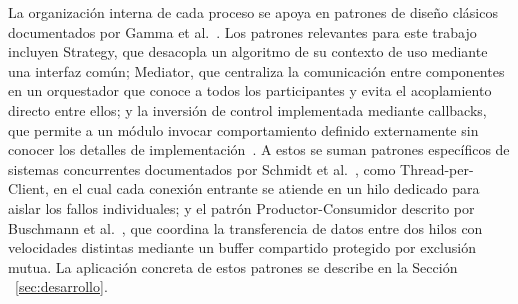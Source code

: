 La organización interna de cada proceso se apoya en patrones de 
diseño clásicos documentados por Gamma et al.~\cite{gof1994}. Los 
patrones relevantes para este trabajo incluyen Strategy, que 
desacopla un algoritmo de su contexto de uso mediante una interfaz 
común; Mediator, que centraliza la comunicación entre componentes 
en un orquestador que conoce a todos los participantes y evita el 
acoplamiento directo entre ellos; y la inversión de control 
implementada mediante callbacks, que permite a un módulo invocar 
comportamiento definido externamente sin conocer los detalles de 
implementación~\cite{gof1994}. A estos se suman patrones 
específicos de sistemas concurrentes documentados por Schmidt et 
al.~\cite{schmidt2000posa2}, como Thread-per-Client, en el cual 
cada conexión entrante se atiende en un hilo dedicado para aislar 
los fallos individuales; y el patrón Productor-Consumidor descrito 
por Buschmann et al.~\cite{buschmann1996posa}, que coordina la 
transferencia de datos entre dos hilos con velocidades distintas 
mediante un buffer compartido protegido por exclusión mutua. La 
aplicación concreta de estos patrones se describe en la Sección 
~\ref{sec:desarrollo}.